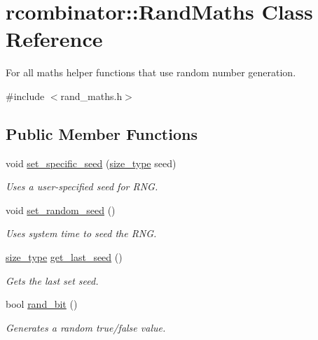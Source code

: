 \hypertarget{classrcombinator_1_1RandMaths}{}\section{rcombinator\+:\+:Rand\+Maths Class Reference}
\label{classrcombinator_1_1RandMaths}


For all maths helper functions that use random number generation.  




{\ttfamily \#include $<$rand\+\_\+maths.\+h$>$}

\subsection*{Public Member Functions}
\begin{DoxyCompactItemize}
\item 
void \mbox{\hyperlink{classrcombinator_1_1RandMaths_a0bf1c2e7a1eccb1f9246b3fceeb5db8a}{set\+\_\+specific\+\_\+seed}} (\mbox{\hyperlink{constants_8h_abcd18a5521fc90ff6e7b00e4fee98397}{size\+\_\+type}} seed)
\begin{DoxyCompactList}\small\item\em Uses a user-\/specified seed for R\+NG. \end{DoxyCompactList}\item 
void \mbox{\hyperlink{classrcombinator_1_1RandMaths_a2b61e31de6067ffa35531d5bde40f4c6}{set\+\_\+random\+\_\+seed}} ()
\begin{DoxyCompactList}\small\item\em Uses system time to seed the R\+NG. \end{DoxyCompactList}\item 
\mbox{\hyperlink{constants_8h_abcd18a5521fc90ff6e7b00e4fee98397}{size\+\_\+type}} \mbox{\hyperlink{classrcombinator_1_1RandMaths_acfc039a9fff053db88eb80df98caa69c}{get\+\_\+last\+\_\+seed}} ()
\begin{DoxyCompactList}\small\item\em Gets the last set seed. \end{DoxyCompactList}\item 
\mbox{\label{classrcombinator_1_1RandMaths_a4f82863502ca04438a331fd309ca8b5e}} 
bool \mbox{\hyperlink{classrcombinator_1_1RandMaths_a4f82863502ca04438a331fd309ca8b5e}{rand\+\_\+bit}} ()
\begin{DoxyCompactList}\small\item\em Generates a random true/false value. \end{DoxyCompactList}\item 

\end{DoxyCompactItemize}
